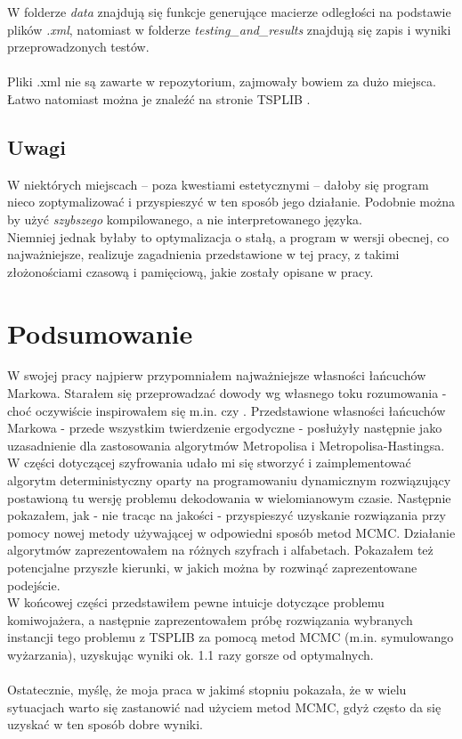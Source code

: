 \documentclass[a4paper]{article}
\theoremstyle{defn}
\theoremstyle{theorem}
\theoremstyle{lemma}
\theoremstyle{cor}
\theoremstyle{fact}
\begin{document}
W folderze \textit{data} znajdują się funkcje generujące macierze odległości na podstawie plików \textit{.xml}, natomiast w folderze \textit{testing\_and\_results} znajdują się zapis i wyniki przeprowadzonych testów. \\\\
Pliki .xml nie są zawarte w repozytorium, zajmowały bowiem za dużo miejsca. Łatwo natomiast można je znaleźć na stronie TSPLIB \cite{benchmark}.
\subsection{Uwagi}
W niektórych miejscach – poza kwestiami estetycznymi – dałoby się program nieco zoptymalizować i przyspieszyć w ten sposób jego działanie. Podobnie można by użyć \textit{szybszego} kompilowanego, a nie interpretowanego języka.\\
Niemniej jednak byłaby to optymalizacja o stałą, a program w wersji obecnej, co najważniejsze, realizuje zagadnienia przedstawione w tej pracy, z takimi złożonościami czasową i pamięciową, jakie zostały opisane w pracy.
\newpage
\section{Podsumowanie}
W swojej pracy najpierw przypomniałem najważniejsze własności łańcuchów Markowa. Starałem się przeprowadzać dowody wg własnego toku rozumowania - choć oczywiście inspirowałem się m.in. \cite{sztencel} czy \cite{coupling}.
Przedstawione własności łańcuchów Markowa - przede wszystkim twierdzenie ergodyczne - posłużyły następnie jako uzasadnienie dla zastosowania algorytmów Metropolisa i Metropolisa-Hastingsa.
\\
W części dotyczącej szyfrowania udało mi się stworzyć i zaimplementować algorytm deterministyczny oparty na programowaniu dynamicznym rozwiązujący postawioną tu wersję problemu dekodowania w wielomianowym czasie. Następnie pokazałem, jak - nie tracąc na jakości - przyspieszyć uzyskanie rozwiązania przy pomocy nowej metody używającej w odpowiedni sposób metod MCMC. Działanie algorytmów zaprezentowałem na różnych szyfrach i alfabetach. Pokazałem też potencjalne przyszłe kierunki, w jakich można by rozwinąć zaprezentowane podejście. \\
W końcowej części przedstawiłem pewne intuicje dotyczące problemu komiwojażera, a następnie zaprezentowałem próbę rozwiązania wybranych instancji tego problemu z TSPLIB za pomocą metod MCMC (m.in. symulowango wyżarzania), uzyskując wyniki ok. 1.1 razy gorsze od optymalnych.\\\\
Ostatecznie, myślę, że moja praca w jakimś stopniu pokazała, że w wielu sytuacjach warto się zastanowić nad użyciem metod MCMC, gdyż często da się uzyskać w ten sposób dobre wyniki.
\end{document}
